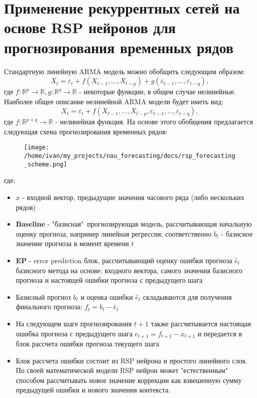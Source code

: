 \documentclass[11pt]{article}
\begin{document}
\section*{Применение рекуррентных сетей на основе RSP нейронов для прогнозирования временных рядов}
Стандартную линейную ARMA модель можно обобщить следующим образом:
$$ X_t = \varepsilon_t + f(X_{t-1}, ..., X_{t-p}) + g(\varepsilon_{t-1},...,\varepsilon_{t-q}) ,$$
где $f: \mathbb{R}^p \to \mathbb{R}, g: \mathbb{R}^q \to \mathbb{R} $ - некоторые функции, в общем случае нелинейные. Наиболее общее описание нелинейной ARMA модели будет иметь вид:
$$ X_t = \varepsilon_t + f(X_{t-1}, ..., X_{t-p}, \varepsilon_{t-1}, ..., \varepsilon_{t-q}) ,$$
где $f: \mathbb{R}^{p+q} \to \mathbb{R}$ - нелинейная функция. На основе этого обобщения предлагается следующая схема прогнозирования временных рядов:
\begin{figure}[H]
\centering
\texttt{[image: /home/ivan/my\_projects/nau\_forecasting/docs/rsp\_forecasting\_scheme.png]}
\label{}
\end{figure}
где:
\begin{itemize}
\item $x$ - входной вектор, предыдущие значения часового ряда (либо нескольких рядов)
\item \textbf{Baseline} - "базисная"\ прогнозирующая модель, рассчитывающая начальную оценку прогноза, например линейная регрессия; соответственно $b_t$ - базисное значение прогноза в момент времени $t$
\item \textbf{EP} - error prediction блок, рассчитывающий оценку ошибки прогноза $\hat{e}_t$ базисного метода на основе: входного вектора, самого значения базисного прогноза и настоящей ошибки прогноза с предыдущего шага
\item Базисный прогноз $b_t$ и оценка ошибки $\hat{e}_t$ складываются для получения финального прогноза: $f_t = b_t - \hat{e}_t$
\item На следующем шаге прогнозирования $t+1$ также рассчитывается настоящая ошибка прогноза с предыдущего шага $e_{t+1} = f_{t+1} - x_{t+1}$ и передается в блок рассчета ошибки прогноза текущего шага
\item Блок рассчета ошибки состоит из RSP нейрона и простого линейного слоя. По своей математической модели RSP нейрон может "естественным" способом рассчитывать новое значение коррекции как взвешенную сумму предыдущей ошибки и нового значения контекста.
\end{itemize}
\end{document}
